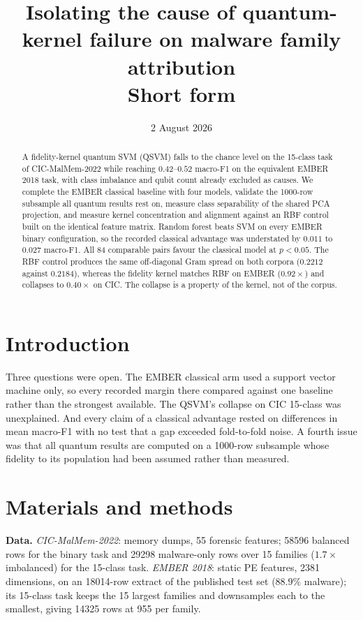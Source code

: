 \documentclass[10pt]{article}
\title{\vspace{-2.2em}Isolating the cause of quantum-kernel failure on
malware family attribution\\[0.2em]
\large Short form}
\date{2 August 2026}
\begin{document}
\maketitle
\vspace{-1.8em}

\begin{abstract}
\noindent
A fidelity-kernel quantum SVM (QSVM) falls to the chance level on the 15-class
task of CIC-MalMem-2022 while reaching $0.42$--$0.52$ macro-F1 on the equivalent
EMBER 2018 task, with class imbalance and qubit count already excluded as causes.
We complete the EMBER classical baseline with four models, validate the 1000-row
subsample all quantum results rest on, measure class separability of the shared
PCA projection, and measure kernel concentration and alignment against an RBF
control built on the identical feature matrix. Random forest beats SVM on every
EMBER binary configuration, so the recorded classical advantage was understated
by $0.011$ to $0.027$ macro-F1. All 84 comparable pairs favour the classical
model at $p<0.05$. The RBF control produces the same off-diagonal Gram spread on
both corpora ($0.2212$ against $0.2184$), whereas the fidelity kernel matches RBF
on EMBER ($0.92\times$) and collapses to $0.40\times$ on CIC. The collapse is a
property of the kernel, not of the corpus.
\end{abstract}

\section{Introduction}

Three questions were open. The EMBER classical arm used a support vector machine
only, so every recorded margin there compared against one baseline rather than
the strongest available. The QSVM's collapse on CIC 15-class was unexplained.
And every claim of a classical advantage rested on differences in mean macro-F1
with no test that a gap exceeded fold-to-fold noise. A fourth issue was that all
quantum results are computed on a 1000-row subsample whose fidelity to its
population had been assumed rather than measured.

\section{Materials and methods}

\textbf{Data.} \emph{CIC-MalMem-2022}: memory dumps, 55 forensic features;
\num{58596} balanced rows for the binary task and \num{29298} malware-only rows
over 15 families ($1.7\times$ imbalanced) for the 15-class task.
\emph{EMBER 2018}: static PE features, 2381 dimensions, on an \num{18014}-row
extract of the published test set ($88.9\%$ malware); its 15-class task keeps the
15 largest families and downsamples each to the smallest, giving \num{14325} rows
at 955 per family.
\end{document}
